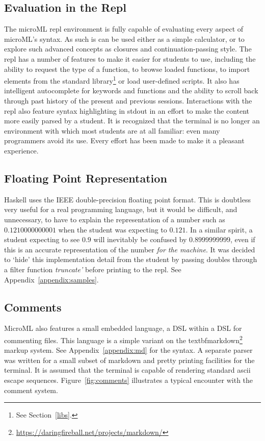 \documentclass[12pt, a4paper]{report}
\begin{document}
\subsection{Evaluation in the Repl}
The microML repl environment is fully capable of evaluating every aspect of microML's syntax. As
such is can be used either as a simple calculator, or to explore such advanced concepts as closures
and continuation-passing style. The repl has a number of features to make it easier for students to
use, including the ability to request the type of a function, to browse loaded functions, to import
elements from the standard library\footnote{See Section~\ref{libs}.} or load user-defined scripts.
It also has intelligent autocomplete for keywords and functions and the ability to scroll back
through past history of the present and previous sessions. Interactions with the repl also feature
syntax highlighting in stdout in an effort to make the content more easily parsed by a student. It
is recognized that the terminal is no longer an environment with which most students are at all
familiar: even many programmers avoid its use. Every effort has been made to make it a pleasant
experience.

\subsection{Floating Point Representation}
\label{floatingPoint}
Haskell uses the IEEE double-precision floating point format\cite{citeulike:4001400}.
This is doubtless very useful for a real programming language, but it would be difficult, and
unnecessary, to have to explain the representation of a number such as $0.1210000000001$ when the
student was expecting to $0.121$. In a similar spirit, a student expecting to see $0.9$ will
inevitably be confused by $0.8999999999$, even if this is an accurate representation of the number
\textit{for the machine}. It was decided to `hide' this implementation detail from the student by
passing doubles through a filter function \textit{truncate'} before printing to the repl. See
Appendix~\ref{appendix:samples}.

\subsection{Comments} MicroML also features a small embedded language, a DSL
within a DSL for commenting files. This language is a simple variant on the
textbf{markdown}\footnote{\url{https://daringfireball.net/projects/markdown/}} markup system. See
Appendix~\ref{appendix:md} for the syntax. A separate parser was written for a small subset of
markdown and pretty printing facilities for the terminal. It is assumed that the terminal is capable
of rendering standard ascii escape sequences. Figure~\ref{fig:comments} illustrates a typical
encounter with the comment system.
\end{document}
